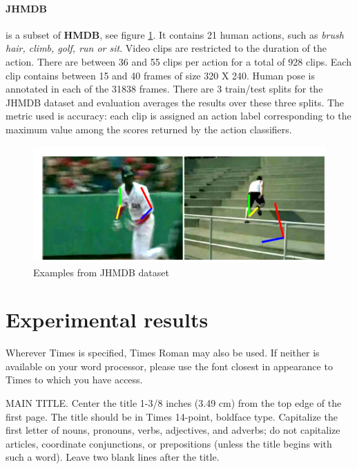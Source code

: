 \documentclass[10pt,twocolumn,letterpaper]{article}
\begin{document}
\paragraph{JHMDB}is a subset of \textbf{HMDB}\cite{kuehne2011hmdb}, see figure \ref{fig:JHMDB}. It contains 21 human actions, such as \textit{brush hair, climb, golf, run or sit}. Video clips are restricted to the duration of the action. There are between 36 and 55 clips per action
for a total of 928 clips. Each clip contains between 15 and
40 frames of size 320 X 240. Human pose is annotated in each of the 31838 frames. There are 3 train/test splits for the JHMDB dataset and evaluation averages the results over these three splits. The metric used is accuracy: each clip
is assigned an action label corresponding to the maximum value among the scores returned by the action classifiers.

\begin{figure}
	\begin{center}
		\includegraphics[width=1.0\linewidth]{JHMDB}
	\end{center}
	\caption{Examples from JHMDB dataset}
	\label{fig:JHMDB}
\end{figure}


\section{Experimental results}
\label{results}
Wherever Times is specified, Times Roman may also be used. If neither is
available on your word processor, please use the font closest in
appearance to Times to which you have access.

MAIN TITLE. Center the title 1-3/8 inches (3.49 cm) from the top edge of
the first page. The title should be in Times 14-point, boldface type.
Capitalize the first letter of nouns, pronouns, verbs, adjectives, and
adverbs; do not capitalize articles, coordinate conjunctions, or
prepositions (unless the title begins with such a word). Leave two blank
lines after the title.
\end{document}
